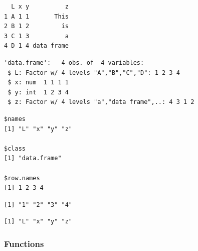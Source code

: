 \begin{verbatim}
  L x y          z
1 A 1 1       This
2 B 1 2         is
3 C 1 3          a
4 D 1 4 data frame
\end{verbatim}

\begin{Shaded}
\begin{Highlighting}[]
\end{Highlighting}
\end{Shaded}

\begin{verbatim}
'data.frame':   4 obs. of  4 variables:
 $ L: Factor w/ 4 levels "A","B","C","D": 1 2 3 4
 $ x: num  1 1 1 1
 $ y: int  1 2 3 4
 $ z: Factor w/ 4 levels "a","data frame",..: 4 3 1 2
\end{verbatim}

\begin{Shaded}
\begin{Highlighting}[]
\end{Highlighting}
\end{Shaded}

\begin{verbatim}
$names
[1] "L" "x" "y" "z"

$class
[1] "data.frame"

$row.names
[1] 1 2 3 4
\end{verbatim}

\begin{Shaded}
\begin{Highlighting}[]
\end{Highlighting}
\end{Shaded}

\begin{verbatim}
[1] "1" "2" "3" "4"
\end{verbatim}

\begin{Shaded}
\begin{Highlighting}[]
\end{Highlighting}
\end{Shaded}

\begin{verbatim}
[1] "L" "x" "y" "z"
\end{verbatim}

\hypertarget{functions}{%
\subsubsection{Functions}\label{functions}}

